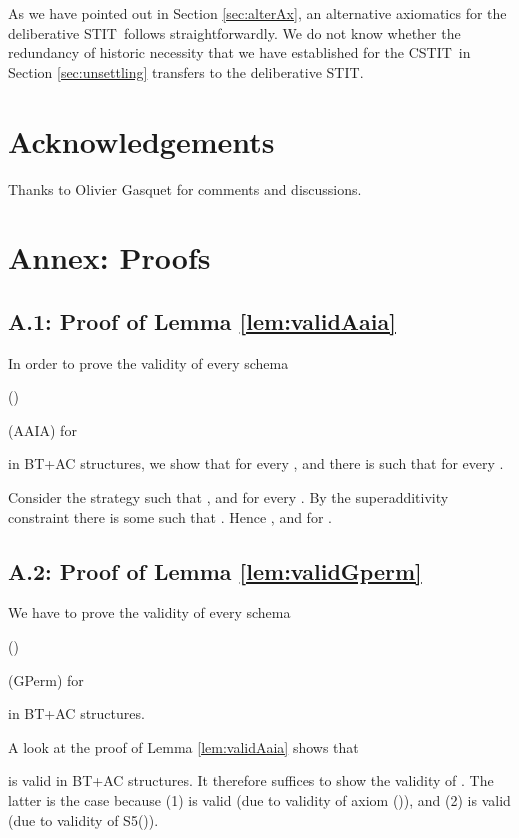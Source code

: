 \documentclass{article}
\newcommand{\InclBox}[1]{}
\newcommand{\STIT} {{\textsf{STIT}}}              \newcommand{\CSTIT}{{\textsf{CSTIT}}}            \newcommand{\DSTIT}{{\textsf{DSTIT}}}
\begin{document}
As we have pointed out in Section \ref{sec:alterAx},
an alternative axiomatics for the deliberative \STIT\ follows
straightforwardly.
We do not know whether the redundancy of historic necessity that we have established
for the \CSTIT\ in Section \ref{sec:unsettling} transfers to the deliberative \STIT.

\section*{Acknowledgements}


Thanks to Olivier Gasquet for comments and discussions.





\section*{Annex: Proofs}


\subsection*{A.1: Proof of Lemma \ref{lem:validAaia}}

In order to prove the validity of every schema
\begin{itemlist}{(\InclBox{i})}
  \item[(AAIA)]
     \hfill for 
\end{itemlist}
in BT+AC structures, we show that for every ,  and
 there is  such that
  for every .

Consider the strategy  such that
, and
 for every .
By the superadditivity constraint there is some  such that
. Hence
, and
 for .


\subsection*{A.2: Proof of Lemma \ref{lem:validGperm}}

We have to prove the validity of every schema
\begin{itemlist}{(\InclBox{i})}
\item[(GPerm)]
  \hfill for 
\end{itemlist}
in BT+AC structures.

A look at the proof of Lemma \ref{lem:validAaia} shows that

is valid in BT+AC structures.
It therefore suffices to show the validity of
.
The latter is the case because
(1)  is valid
(due to validity of axiom (\InclBox{i})), and
(2)  is valid
(due to validity of S5()).
\end{document}
